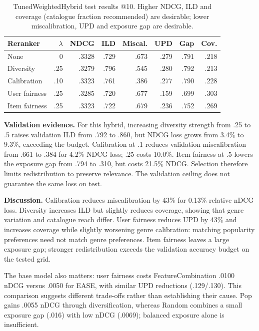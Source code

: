 \documentclass[12pt,a4paper]{article}   %
\begin{document}
\begin{table}[H]
\centering
\begin{tabular}{lrrrrrrr}
\toprule
Reranker & $\lambda$ & NDCG & ILD & Miscal. & UPD & Gap & Cov. \\
\midrule
None & 0 & .3328 & .729 & .673 & .279 & .791 & .218 \\
Diversity & .25 & .3279 & .796 & .545 & .280 & .792 & .213 \\
Calibration & .10 & .3323 & .761 & .386 & .277 & .790 & .228 \\
User fairness & .25 & .3285 & .720 & .677 & .159 & .699 & .303 \\
Item fairness & .25 & .3323 & .722 & .679 & .236 & .752 & .269 \\
\bottomrule
\end{tabular}
\caption{TunedWeightedHybrid test results @10. Higher NDCG, ILD and coverage (catalogue fraction recommended) are desirable; lower miscalibration, UPD and exposure gap are desirable.}
\label{tab:radu-reranking}
\end{table}

\textbf{Validation evidence.}
For this hybrid, increasing diversity strength from .25 to .5 raises validation ILD from .792 to .860, but NDCG loss grows from 3.4\% to 9.3\%, exceeding the budget. Calibration at .1 reduces validation miscalibration from .661 to .384 for 4.2\% NDCG loss; .25 costs 10.0\%. Item fairness at .5 lowers the exposure gap from .794 to .310, but costs 21.5\% NDCG. Selection therefore limits redistribution to preserve relevance. The validation ceiling does not guarantee the same loss on test.

\textbf{Discussion.}
Calibration reduces miscalibration by 43\% for 0.13\% relative
nDCG loss. Diversity increases ILD but slightly reduces
coverage, showing that genre variation and catalogue reach
differ. User fairness reduces UPD by 43\% and increases
coverage while slightly worsening genre calibration:
matching popularity preferences need not match genre
preferences. Item fairness leaves a large exposure gap;
stronger redistribution exceeds the validation accuracy
budget on the tested grid.

The base model also matters: user fairness costs
FeatureCombination .0100 nDCG versus .0050 for EASE, with
similar UPD reductions (.129/.130). This comparison suggests
different trade-offs rather than establishing their cause.
Pop gains .0055 nDCG through diversification, whereas Random
combines a small exposure gap (.016) with low nDCG (.0069);
balanced exposure alone is insufficient.
\end{document}
